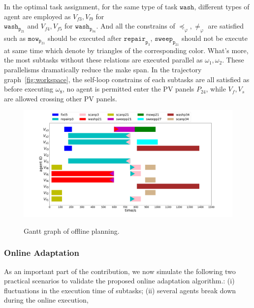 In the optimal task assignment, for the same type of task $\texttt{wash}$,
different types of agent are employed as $V_{f3},V_{l9}$ for \\$\texttt{wash}_{\texttt{p}_{21}}$ and
 $V_{f4},V_{f5}$ for $\texttt{wash}_{\texttt{p}_{34}}$. And all the constrains 
 of $\preceq_\varphi,\neq_\varphi$ are satisfied such as $\texttt{mow}_{\texttt{p}_{21}}$ 
should be executed after $\texttt{repair}_{\texttt{p}_3}$, $\texttt{sweep}_{\texttt{p}_21}$
should not be execute at same time which denote by triangles of the corresponding color.
What's more, the most subtasks without these relations are executed parallel as $\omega_1,\omega_2$.
These parallelisms dramatically reduce the make span.
In the trajectory graph~\ref{fig:workspace}, the self-loop constrains of each subtasks are all satisfied
as before executing $\omega_8$, no agent is permitted enter the PV panels $P_{24}$, while $V_f, V_s$ are allowed 
crossing other PV panels.


\begin{figure}[t!]
  \begin{minipage}[t]{1\linewidth}
		\includegraphics[height =0.5\textwidth]{figures/simulation/taskfinal/gantt_sim.pdf}
	
\end{minipage}%
   \centering %
   \label{Gantt_graph}
\caption{ Gantt graph of offline planning. } 
\end{figure}

\subsubsection{Online Adaptation}\label{subsubsec:exp-adapt}
As an important part of the contribution, we now simulate
the following two practical scenarios to validate the proposed online adaptation algorithm.:
(i) fluctuations in the execution time of subtasks;
(ii) several agents break down during the online execution,

